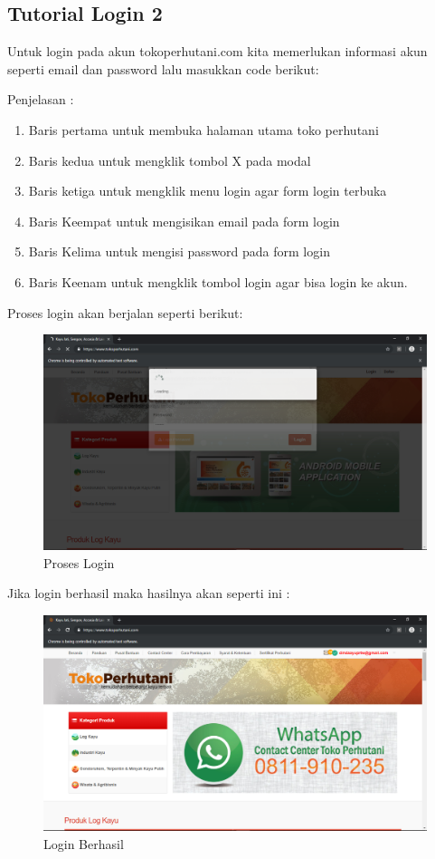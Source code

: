 \newpage
\subsection{Tutorial Login 2}
Untuk login pada akun tokoperhutani.com kita memerlukan informasi akun seperti email dan password lalu masukkan code berikut:


Penjelasan :
\begin{enumerate}
	\item Baris pertama untuk membuka halaman utama toko perhutani
	\item Baris kedua untuk mengklik tombol X pada modal
	\item Baris ketiga untuk mengklik menu login agar form login terbuka
	\item Baris Keempat untuk mengisikan email pada form login 
	\item Baris Kelima untuk mengisi password pada form login
	\item Baris Keenam untuk mengklik tombol login agar bisa login ke akun.
\end{enumerate}

\newpage
Proses login akan berjalan seperti berikut:
\begin{figure}[h]
	\centering
	\includegraphics[scale=0.28]{figures/1login}
	\caption{Proses Login}
\end{figure}

Jika login berhasil maka hasilnya akan seperti ini :
\begin{figure}[h]
	\centering
	\includegraphics[scale=0.28]{figures/loginn}
	\caption{Login Berhasil}
\end{figure}

